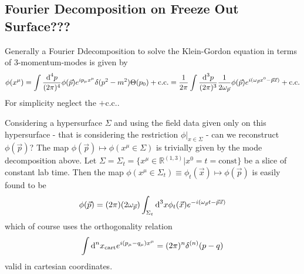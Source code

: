 \subsection{Fourier Decomposition on Freeze Out Surface???}

Generally a Fourier Ddecomposition to solve the Klein-Gordon equation in terms of $3$-momentum-modes is given by
\begin{equation}
    \phi(x^\mu)=\int\frac{\text{d}^4p}{(2\pi)^4}\phi(\vec{p})e^{{i} p_\mu x^\mu}\delta(p^2-m^2)\Theta(p_0)+\text{c.c.}=\frac{1}{2\pi}\int\frac{\text{d}^3p}{(2\pi)^3}\frac{1}{2\omega_{\vec{p}}}\phi(\vec{p})e^{{i}(\omega_{\vec{p}}x^0-\vec{p}\vec{x})}+\text{c.c.}
\end{equation}
For simplicity neglect the $+\text{c.c.}$.

Considering a hypersurface $\Sigma$ and using the field data given only on this hypersurface - that is considering the restriction $\phi\vert_{x\in\Sigma}$ - can we reconstruct $\phi(\vec{p})$? The map $\phi(\vec{p})\mapsto\phi(x^\mu\in\Sigma)$ is trivially given by the mode decomposition above. Let $\Sigma=\Sigma_t=\{x^\mu\in\mathbb{R}^{(1,3)}\vert x^0=t=\text{const}\}$ be a slice of constant lab time. Then the map $\phi(x^\mu\in\Sigma_t)\equiv \phi_t(\vec{x})\mapsto\phi(\vec{p})$ is easily found to be
\begin{equation}
    \phi(\vec{p})=(2\pi)(2\omega_{\vec{p}})\int_{\Sigma_t}\text{d}^3x\phi_t(\vec{x})e^{-{i}(\omega_{\vec{p}}t-\vec{p}\vec{x})}
\end{equation}
which of course uses the orthogonality relation
\begin{equation}
    \int\text{d}^nx_{\text{cart}}e^{{i} (p_\mu-q_\mu)x^\mu}=(2\pi)^n\delta^{(n)}(p-q)
\end{equation}
valid in cartesian coordinates.

